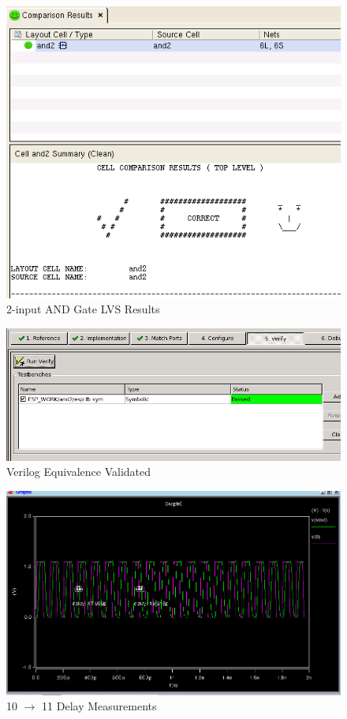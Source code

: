\documentclass[12pt]{article}
\begin{document}
\begin{figure}[H]
\centering
\includegraphics[width=0.7\linewidth]{and2-lvs}
\caption{2-input AND Gate LVS Results}
\label{fig:and2-lvs}
\end{figure}


\begin{figure}[H]
\centering
\includegraphics[width=0.7\linewidth]{verilog-verified}
\caption{Verilog Equivalence Validated}
\label{fig:verilog-verified}
\end{figure}


\begin{figure}
\centering
\includegraphics[width=\linewidth]{10-11-delay}
\caption{10 $\to$ 11 Delay Measurements}
\label{fig:10-11-delay}
\end{figure}
\end{document}
